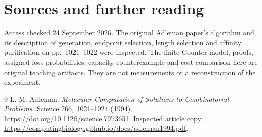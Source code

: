 \chapter*{Sources and further reading}
Access checked 24 September 2026. The original Adleman paper's algorithm and
its description of generation, endpoint selection, length selection and
affinity purification on pp.~1021--1022 were inspected.
The finite Counter model, proofs, assigned loss probabilities, capacity
counterexample and cost comparison here are original teaching artifacts.
They are not measurements or a reconstruction of the experiment.
\begingroup\let\chapter\section
\begin{thebibliography}{9}
 L. M. Adleman. \emph{Molecular Computation of Solutions to
Combinatorial Problems}. Science 266, 1021--1024 (1994).
\url{https://doi.org/10.1126/science.7973651}.
Inspected article copy:
\url{https://computingbiology.github.io/docs/adleman1994.pdf}.
\end{thebibliography}\endgroup
